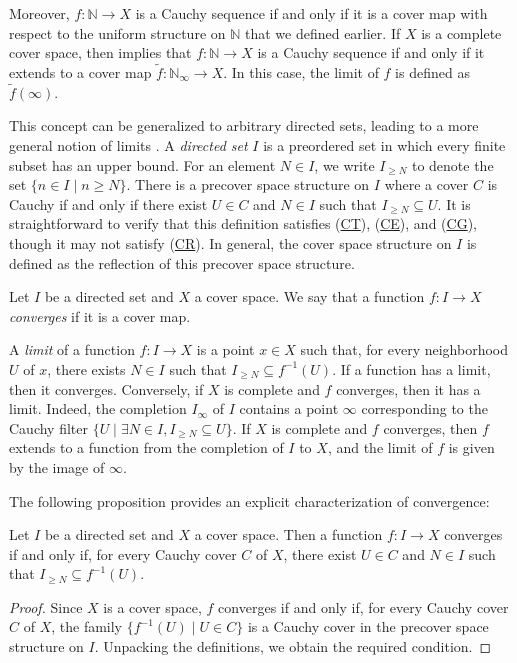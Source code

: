 \documentclass[pdflatex,sn-mathphys-num]{sn-jnl}
\newcommand{\axref}[1]{(\hyperref[ax:#1]{#1})}
\theoremstyle{definition}
\theoremstyle{remark}
\numberwithin{figure}{section}
\begin{document}
Moreover, $f : \mathbb{N} \to X$ is a Cauchy sequence if and only if it is a cover map with respect to the uniform structure on $\mathbb{N}$ that we defined earlier.
If $X$ is a complete cover space, then  implies that $f : \mathbb{N} \to X$ is a Cauchy sequence if and only if it extends to a cover map $\widetilde{f} : \mathbb{N}_\infty \to X$.
In this case, the limit of $f$ is defined as $\widetilde{f}(\infty)$.

This concept can be generalized to arbitrary directed sets, leading to a more general notion of limits \cite{limits}.
A \emph{directed set} $I$ is a preordered set in which every finite subset has an upper bound.
For an element $N \in I$, we write $I_{\geq N}$ to denote the set $\{ n \in I \mid n \geq N \}$.
There is a precover space structure on $I$ where a cover $C$ is Cauchy if and only if there exist $U \in C$ and $N \in I$ such that $I_{\geq N} \subseteq U$.
It is straightforward to verify that this definition satisfies \axref{CT}, \axref{CE}, and \axref{CG}, though it may not satisfy \axref{CR}.
In general, the cover space structure on $I$ is defined as the reflection of this precover space structure.

\begin{defn}
Let $I$ be a directed set and $X$ a cover space.
We say that a function $f : I \to X$ \emph{converges} if it is a cover map.
\end{defn}

A \emph{limit} of a function $f : I \to X$ is a point $x \in X$ such that, for every neighborhood $U$ of $x$, there exists $N \in I$ such that $I_{\geq N} \subseteq f^{-1}(U)$.
If a function has a limit, then it converges.
Conversely, if $X$ is complete and $f$ converges, then it has a limit.
Indeed, the completion $I_\infty$ of $I$ contains a point $\infty$ corresponding to the Cauchy filter $\{ U \mid \exists N \in I, I_{\geq N} \subseteq U \}$.
If $X$ is complete and $f$ converges, then $f$ extends to a function from the completion of $I$ to $X$, and the limit of $f$ is given by the image of $\infty$.

The following proposition provides an explicit characterization of convergence:

\begin{prop}
Let $I$ be a directed set and $X$ a cover space.
Then a function $f : I \to X$ converges if and only if, for every Cauchy cover $C$ of $X$, there exist $U \in C$ and $N \in I$ such that $I_{\geq N} \subseteq f^{-1}(U)$.
\end{prop}
\begin{proof}
Since $X$ is a cover space, $f$ converges if and only if, for every Cauchy cover $C$ of $X$, the family $\{ f^{-1}(U) \mid U \in C \}$ is a Cauchy cover in the precover space structure on $I$.
Unpacking the definitions, we obtain the required condition.
\end{proof}
\end{document}
